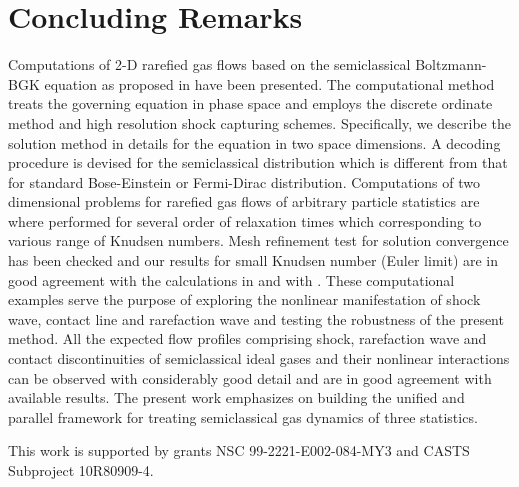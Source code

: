 \documentclass[twoside,twocolumn,prc,floats,amsmath,amssymb]{revtex4} %
\begin{document}
\section{Concluding Remarks}
Computations of 2-D rarefied gas flows based on the semiclassical Boltzmann-BGK equation as proposed in \cite{Yang2013} have been presented. The computational method treats the governing equation in phase space and employs the discrete ordinate method and high resolution shock capturing schemes. Specifically, we describe the solution method in details for the equation in two space dimensions.   A decoding procedure is devised for the semiclassical distribution which is different from that for standard Bose-Einstein or Fermi-Dirac distribution.  Computations of two dimensional problems for rarefied gas flows of arbitrary particle statistics are where performed for several order of relaxation times which corresponding to various range of Knudsen numbers.  Mesh refinement test for solution convergence has been checked and our results for small Knudsen number (Euler limit) are in good agreement with the calculations in \cite{Laxliu1995}\cite{Rinne1993} and with \cite{Cockburn1998,Woodward1984}.    These computational examples serve the purpose of exploring the nonlinear manifestation of shock wave, contact line and rarefaction wave and testing the robustness of the present method. All the expected flow profiles comprising shock, rarefaction wave and contact discontinuities of semiclassical ideal gases and their nonlinear interactions can be observed with considerably good detail and are in good agreement with available results. The present work emphasizes on building the unified and parallel framework for treating semiclassical gas dynamics of three statistics. 

This work is supported by grants NSC 99-2221-E002-084-MY3 and CASTS Subproject 10R80909-4.
\end{document}

